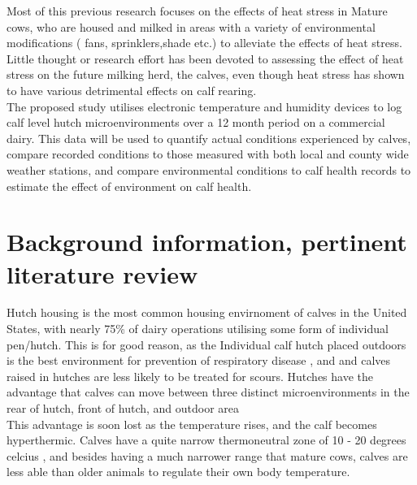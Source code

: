 \documentclass[12pt]{article}
\begin{document}
	Most of this previous research focuses on the effects of heat stress in Mature cows, who are housed and milked in areas with a variety of environmental modifications ( fans, sprinklers,shade etc.)  to alleviate the effects of heat stress.\cite{Armstrong1994}
	Little thought or research effort has been devoted to assessing the effect of heat stress on the future milking herd, the calves, even though heat stress has shown to have various detrimental effects on calf rearing. \cite{Stott1976,lacetera1994}\\


	The proposed study utilises electronic temperature and humidity devices to log calf level hutch microenvironments over a 12 month period on a commercial dairy. This data will be used to quantify actual conditions experienced by calves, compare recorded conditions to those measured with both local and county wide weather stations, and compare environmental conditions to calf health records to estimate the effect of environment on calf health. 

	\newpage
	\section{Background information, pertinent literature review}
	Hutch housing is the most common housing envirnoment of calves in the United States, with nearly 75\% of dairy operations utilising some form of individual pen/hutch.\cite{NAHMS2007}
	This is for good reason, as the Individual calf hutch placed outdoors is the best environment for prevention of respiratory disease \cite{callan2002biosecurity}, and and calves raised in hutches are less likely to be treated for scours. \cite{Waltner-Toews1986}
	Hutches have the advantage that calves can move between three distinct microenvironments in the rear of hutch, front of hutch, and outdoor area ~\cite{brunsvold1985} \\
	This advantage is soon lost as the temperature rises, and the calf becomes hyperthermic. Calves have a quite narrow thermoneutral zone of 10 - 20 degrees celcius \cite{Gebremedhin1981}, and besides having a much narrower range that mature cows, calves are less able than older animals to regulate their own body temperature.\cite{Christopherson1976}\\
\end{document}
